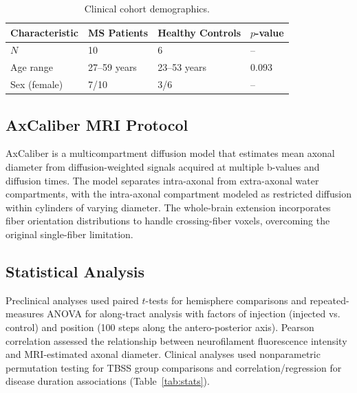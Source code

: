 \documentclass[11pt]{article}
\begin{document}
\begin{table}[htbp]
\centering
\caption{Clinical cohort demographics.}
\label{tab:cohort}
\begin{tabular}{llll}
\toprule
Characteristic & MS Patients & Healthy Controls & $p$-value \\
\midrule
$N$ & 10 & 6 & -- \\
Age range & 27--59 years & 23--53 years & 0.093 \\
Sex (female) & 7/10 & 3/6 & -- \\
\bottomrule
\end{tabular}
\end{table}

\subsection{AxCaliber MRI Protocol}

AxCaliber is a multicompartment diffusion model that estimates mean axonal diameter from diffusion-weighted signals acquired at multiple b-values and diffusion times. The model separates intra-axonal from extra-axonal water compartments, with the intra-axonal compartment modeled as restricted diffusion within cylinders of varying diameter. The whole-brain extension incorporates fiber orientation distributions to handle crossing-fiber voxels, overcoming the original single-fiber limitation.

\subsection{Statistical Analysis}

Preclinical analyses used paired $t$-tests for hemisphere comparisons and repeated-measures ANOVA for along-tract analysis with factors of injection (injected vs. control) and position (100 steps along the antero-posterior axis). Pearson correlation assessed the relationship between neurofilament fluorescence intensity and MRI-estimated axonal diameter. Clinical analyses used nonparametric permutation testing for TBSS group comparisons and correlation/regression for disease duration associations (Table~\ref{tab:stats}).
\end{document}
